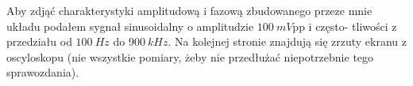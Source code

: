 \documentclass[14pt, table]{extarticle}
\begin{document}
\begin{figure}[H]
    \centering
\end{figure}

\newpage
Aby zdjąć charakterystyki amplitudową i fazową zbudowanego przeze mnie układu podałem sygnał sinusoidalny o amplitudzie $100 \ mV$pp i często- tliwości z przedziału od $100 \ Hz$ do $900 \ kHz$. Na kolejnej stronie znajdują się zrzuty ekranu z oscyloskopu (nie wszystkie pomiary, żeby nie przedłużać niepotrzebnie tego sprawozdania).
\end{document}
